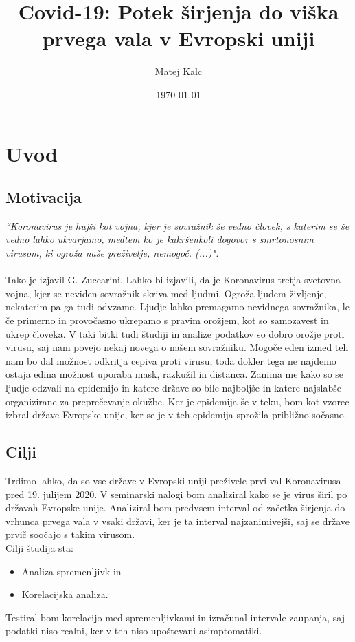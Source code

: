 \documentclass[a4paper,11pt]{article}
\title{Covid-19: Potek širjenja do viška prvega vala v Evropski uniji}
\author{Matej Kalc} %
\date{\today}
\begin{document}
\maketitle

\section{Uvod}
\subsection{Motivacija}


\emph{“Koronavirus je hujši kot vojna, kjer je sovražnik še vedno človek, s katerim se še
vedno lahko ukvarjamo, medtem ko je kakršenkoli dogovor s smrtonosnim virusom,
ki ogroža naše preživetje, nemogoč. (...)".} \cite{zucc}\\ \\
Tako je izjavil G. Zuccarini. Lahko bi izjavili, da je Koronavirus tretja svetovna vojna, kjer se neviden sovražnik skriva med ljudmi. Ogroža ljudem življenje, nekaterim pa ga tudi odvzame. Ljudje lahko premagamo nevidnega sovražnika, le če primerno in provočasno ukrepamo s pravim orožjem, kot so samozavest in ukrep človeka. V taki bitki tudi študiji in analize podatkov so dobro orožje proti virusu, saj nam povejo nekaj novega o našem sovražniku. Mogoče eden izmed teh nam bo dal možnost odkritja cepiva proti virusu, toda dokler tega ne najdemo ostaja edina možnost uporaba mask, razkužil in distanca. Zanima me kako so se ljudje odzvali na epidemijo in katere države so bile najboljše in katere najslabše organizirane za preprečevanje okužbe. Ker je epidemija še v teku, bom kot vzorec izbral države Evropske unije, ker se je v teh epidemija sprožila približno sočasno. 


\subsection{Cilji}
Trdimo lahko, da so vse države v Evropski uniji \cite{eu} preživele prvi val Koronavirusa pred 19. julijem 2020. V seminarski nalogi bom analiziral kako se je virus širil po državah Evropske unije. Analiziral bom predvsem interval od začetka širjenja do vrhunca prvega vala v vsaki državi, ker je ta interval najzanimivejši, saj se države prvič soočajo s takim virusom. \\
Cilji študija sta:
\begin{itemize}
\item{Analiza spremenljivk in}
\item{Korelacijska analiza.}
\end{itemize}
Testiral bom korelacijo med spremenljivkami in izračunal intervale zaupanja, saj podatki niso realni, ker v teh niso upoštevani asimptomatiki.
\end{document}
